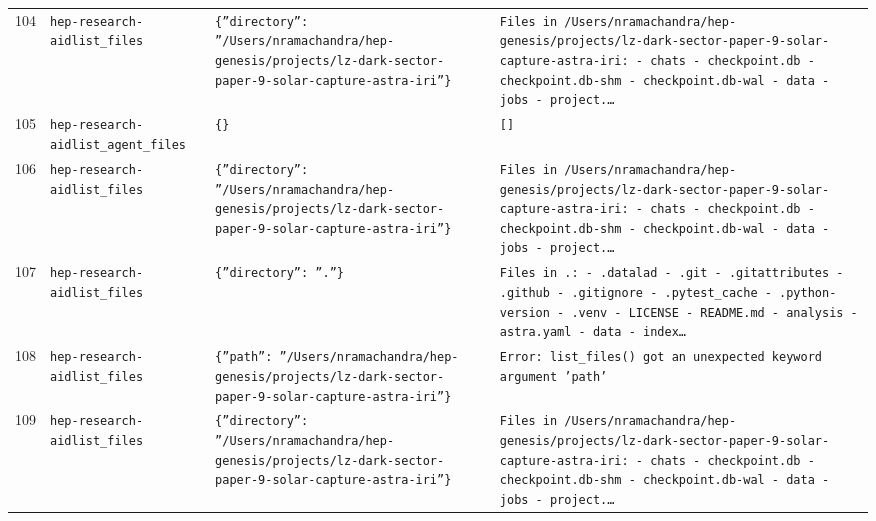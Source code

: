 \documentclass[11pt,a4paper]{article}
\begin{document}
\begin{longtable}{@{}p{}p{}p{}p{}@{}}
104 & \texttt{hep-research-aid}\newline\texttt{list\_\allowbreak{}files} & \texttt{\{''directory'':\allowbreak{} ''/\allowbreak{}Users/\allowbreak{}nramachandra/\allowbreak{}hep-genesis/\allowbreak{}projects/\allowbreak{}lz-dark-sector-paper-9-solar-capture-astra-iri''\}\allowbreak{}} & \texttt{Files in /\allowbreak{}Users/\allowbreak{}nramachandra/\allowbreak{}hep-genesis/\allowbreak{}projects/\allowbreak{}lz-dark-sector-paper-9-solar-capture-astra-iri:\allowbreak{}   - chats   - checkpoint.db   - checkpoint.db-shm   - checkpoint.db-wal   - data   - jobs   - project.\ldots{}\allowbreak{}} \\
105 & \texttt{hep-research-aid}\newline\texttt{list\_\allowbreak{}agent\_\allowbreak{}files} & \texttt{\{\}\allowbreak{}} & \texttt{[]\allowbreak{}} \\
106 & \texttt{hep-research-aid}\newline\texttt{list\_\allowbreak{}files} & \texttt{\{''directory'':\allowbreak{} ''/\allowbreak{}Users/\allowbreak{}nramachandra/\allowbreak{}hep-genesis/\allowbreak{}projects/\allowbreak{}lz-dark-sector-paper-9-solar-capture-astra-iri''\}\allowbreak{}} & \texttt{Files in /\allowbreak{}Users/\allowbreak{}nramachandra/\allowbreak{}hep-genesis/\allowbreak{}projects/\allowbreak{}lz-dark-sector-paper-9-solar-capture-astra-iri:\allowbreak{}   - chats   - checkpoint.db   - checkpoint.db-shm   - checkpoint.db-wal   - data   - jobs   - project.\ldots{}\allowbreak{}} \\
107 & \texttt{hep-research-aid}\newline\texttt{list\_\allowbreak{}files} & \texttt{\{''directory'':\allowbreak{} ''.''\}\allowbreak{}} & \texttt{Files in .:\allowbreak{}   - .datalad   - .git   - .gitattributes   - .github   - .gitignore   - .pytest\_\allowbreak{}cache   - .python-version   - .venv   - LICENSE   - README.md   - analysis   - astra.yaml   - data   - index\ldots{}\allowbreak{}} \\
108 & \texttt{hep-research-aid}\newline\texttt{list\_\allowbreak{}files} & \texttt{\{''path'':\allowbreak{} ''/\allowbreak{}Users/\allowbreak{}nramachandra/\allowbreak{}hep-genesis/\allowbreak{}projects/\allowbreak{}lz-dark-sector-paper-9-solar-capture-astra-iri''\}\allowbreak{}} & \texttt{Error:\allowbreak{} list\_\allowbreak{}files()\allowbreak{} got an unexpected keyword argument 'path'} \\
109 & \texttt{hep-research-aid}\newline\texttt{list\_\allowbreak{}files} & \texttt{\{''directory'':\allowbreak{} ''/\allowbreak{}Users/\allowbreak{}nramachandra/\allowbreak{}hep-genesis/\allowbreak{}projects/\allowbreak{}lz-dark-sector-paper-9-solar-capture-astra-iri''\}\allowbreak{}} & \texttt{Files in /\allowbreak{}Users/\allowbreak{}nramachandra/\allowbreak{}hep-genesis/\allowbreak{}projects/\allowbreak{}lz-dark-sector-paper-9-solar-capture-astra-iri:\allowbreak{}   - chats   - checkpoint.db   - checkpoint.db-shm   - checkpoint.db-wal   - data   - jobs   - project.\ldots{}\allowbreak{}} \\

\end{longtable}
\end{document}
